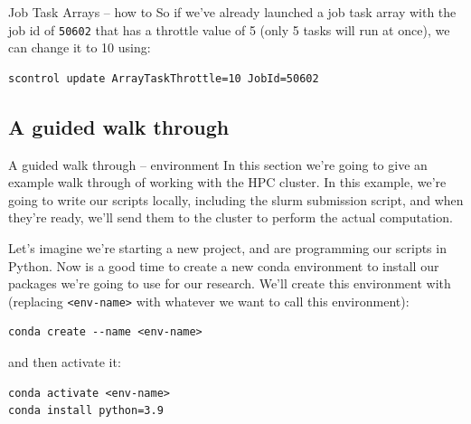 \documentclass[10pt]{beamer}
\begin{document}
\begin{frame}[label={sec:orgc400f79},fragile]{Job Task Arrays -- how to}
 So if we've already launched a job task array with the job id of \texttt{50602} that has
a throttle value of 5 (only 5 tasks will run at once), we can change it to 10
using:

\begin{verbatim}
scontrol update ArrayTaskThrottle=10 JobId=50602
\end{verbatim}
\end{frame}

\subsection{A guided walk through}
\label{sec:org0c9111e}

\begin{frame}[label={sec:orgde26818},fragile]{A guided walk through -- environment}
 In this section we're going to give an example walk through of working with the
HPC cluster. In this example, we're going to write our scripts locally,
including the slurm submission script, and when they're ready, we'll send them
to the cluster to perform the actual computation.

Let's imagine we're starting a new project, and are programming our scripts in
Python. Now is a good time to create a new conda environment to install our
packages we're going to use for our research. We'll create this environment with
(replacing \texttt{<env-name>} with whatever we want to call this environment):

\begin{verbatim}
conda create --name <env-name>
\end{verbatim}

and then activate it:

\begin{verbatim}
conda activate <env-name>
conda install python=3.9
\end{verbatim}
\end{frame}
\end{document}

